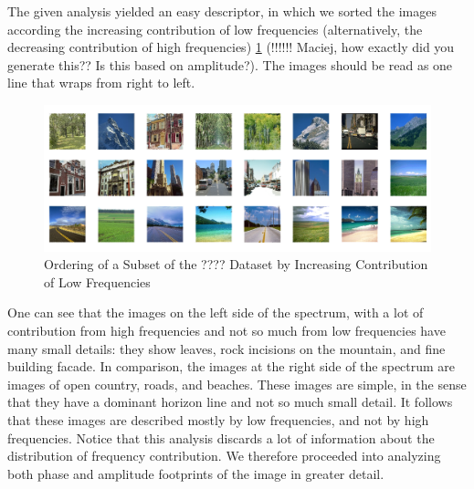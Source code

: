 \documentclass{report}
\begin{document}
The given analysis yielded an easy descriptor, in which we sorted the images according the increasing contribution of low frequencies (alternatively, the decreasing contribution of high frequencies) \ref{fig:fft_low_freq_order} (!!!!!! Maciej, how exactly did you generate this?? Is this based on amplitude?). The images should be read as one line that wraps from right to left. 
\begin{figure}[hbtp]
\centering
\includegraphics[scale=0.3]{graphics/FrequencyOrdered.png}
\caption{Ordering of a Subset of the ???? Dataset by Increasing Contribution of Low Frequencies}
\label{fig:fft_low_freq_order}
\end{figure}
One can see that the images on the left side of the spectrum, with a lot of contribution from high frequencies and not so much from low frequencies have many small details: they show leaves, rock incisions on the mountain, and fine building facade. In comparison, the images at the right side of the spectrum are images of open country, roads, and beaches. These images are simple, in the sense that they have a dominant horizon line and not so much small detail. It follows that these images are described mostly by low frequencies, and not by high frequencies. Notice that this analysis discards a lot of information about the distribution of frequency contribution. We therefore proceeded into analyzing both phase and amplitude footprints of the image in greater detail.
\end{document}
